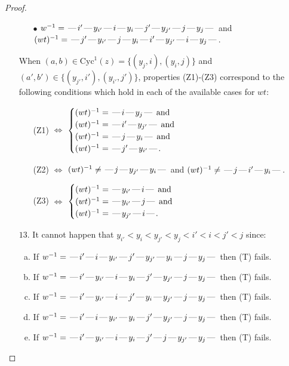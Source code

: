 \documentclass[10pt]{article}
\theoremstyle{definition}
\theoremstyle{definition}
\def\dash{\text{\hspace{0.5mm}---\hspace{0.5mm}}}
\def\Cyc{\mathrm{Cyc}}
\begin{document}
\begin{proof}
\begin{enumerate}
\begin{enumerate}
\item[$\bullet$] $w^{-1} = \dash i'\dash y_{i'}\dash i\dash y_i\dash j'\dash y_{j'}\dash j\dash y_j\dash $ and $(wt)^{-1} = \dash j'\dash y_{i'}\dash j\dash y_i\dash i'\dash y_{j'}\dash i\dash y_j\dash $.
\end{enumerate}
When $(a,b)\in\Cyc^1(z)=\{(y_j,i),(y_i,j)\}$ and $(a',b')\in\{(y_{j'},i'),(y_{i'},j')\}$,
properties (Z1)-(Z3) correspond to the following conditions which
hold in each of the available cases for $wt$:
\begin{enumerate}
\item[](Z1) $\Leftrightarrow$ $\begin{cases}\text{$(wt)^{-1} = \dash i \dash y_j \dash$}\text{ and }\\
\text{$(wt)^{-1} = \dash i' \dash y_{j'} \dash$}\text{ and }\\
\text{$(wt)^{-1} = \dash j \dash y_i \dash$}\text{ and }\\
\text{$(wt)^{-1} = \dash j' \dash y_{i'} \dash$}.\end{cases}$
\item[](Z2) $\Leftrightarrow$ $(wt)^{-1} \neq \dash j \dash y_{j'} \dash y_i \dash$ and $(wt)^{-1}\neq \dash j \dash i' \dash y_i \dash$.
\item[](Z3) $\Leftrightarrow$ $\begin{cases}\text{$(wt)^{-1} = \dash y_{i'} \dash i \dash$}\text{ and }\\
\text{$(wt)^{-1} = \dash y_{i'} \dash j \dash$}\text{ and }\\
\text{$(wt)^{-1} = \dash y_{j'} \dash i \dash$}.\end{cases}$
\end{enumerate}
\item[$13$.] It cannot happen that $y_{i'} < y_i < y_{j'} < y_j < i' < i < j' < j$ since:
\begin{enumerate}[(a)]
\item If $w^{-1} = \dash i'\dash i\dash y_{i'}\dash j'\dash y_{j'}\dash y_i\dash j\dash y_j\dash $ then (T) fails.
\item If $w^{-1} = \dash i'\dash y_{i'}\dash i\dash y_i\dash j'\dash y_{j'}\dash j\dash y_j\dash $ then (T) fails.
\item If $w^{-1} = \dash i'\dash y_{i'}\dash i\dash j'\dash y_i\dash y_{j'}\dash j\dash y_j\dash $ then (T) fails.
\item If $w^{-1} = \dash i'\dash i\dash y_{i'}\dash y_i\dash j'\dash y_{j'}\dash j\dash y_j\dash $ then (T) fails.
\item If $w^{-1} = \dash i'\dash y_{i'}\dash i\dash y_i\dash j'\dash j\dash y_{j'}\dash y_j\dash $ then (T) fails.

\end{enumerate}
\end{enumerate}
\end{proof}
\end{document}
